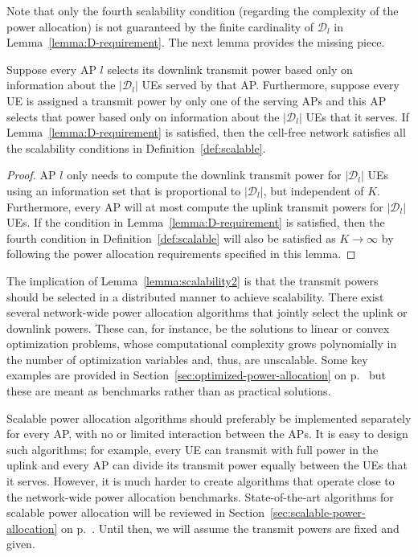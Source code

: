 Note that only the fourth scalability condition (regarding the complexity of the power allocation) is not guaranteed by the finite cardinality of $\mathcal{D}_l$ in Lemma~\ref{lemma:D-requirement}. The next lemma provides the missing piece.

\begin{lemma} \label{lemma:scalability2}
Suppose every AP $l$ selects its downlink transmit power based only on information about the $|\mathcal{D}_l|$ UEs served by that AP. Furthermore, suppose every UE is assigned a transmit power by only one of the serving APs and this AP selects that power based only on information about the $|\mathcal{D}_l|$ UEs that it serves. If Lemma~\ref{lemma:D-requirement} is satisfied, then the cell-free network satisfies all the scalability conditions in Definition~\ref{def:scalable}.
\end{lemma}
\begin{proof}
\gls{AP} $l$ only needs to compute the downlink transmit power for $|\mathcal{D}_l|$ UEs using an information set that is proportional to $|\mathcal{D}_l|$, but independent of $K$. Furthermore, every AP will at most compute the uplink transmit powers for $|\mathcal{D}_l|$ UEs. If the condition in Lemma~\ref{lemma:D-requirement} is satisfied, then the fourth condition in Definition~\ref{def:scalable} will also be satisfied as $K \to \infty$ by following the power allocation requirements specified in this lemma.
\end{proof}

The implication of Lemma~\ref{lemma:scalability2} is that the transmit powers should be selected in a distributed manner to achieve scalability. There exist several network-wide power allocation algorithms that jointly select the uplink or downlink powers. 
These can, for instance, be the solutions to linear or convex optimization problems, whose computational complexity grows polynomially in the number of optimization variables and, thus, are unscalable.
Some key examples are provided in Section~\ref{sec:optimized-power-allocation} on p.~\pageref{sec:optimized-power-allocation} but these are meant as benchmarks rather than as practical solutions.

Scalable power allocation algorithms should preferably be implemented separately for every AP, with no or limited interaction between the APs. It is easy to design such algorithms; for example, every UE can transmit with full power in the uplink and every AP can divide its transmit power equally between the UEs that it serves.
However, it is much harder to create algorithms that operate close to the network-wide power allocation benchmarks. State-of-the-art algorithms for scalable power allocation will be reviewed in Section~\ref{sec:scalable-power-allocation} on p.~\pageref{sec:scalable-power-allocation}. Until then, we will assume the transmit powers are fixed and given.

